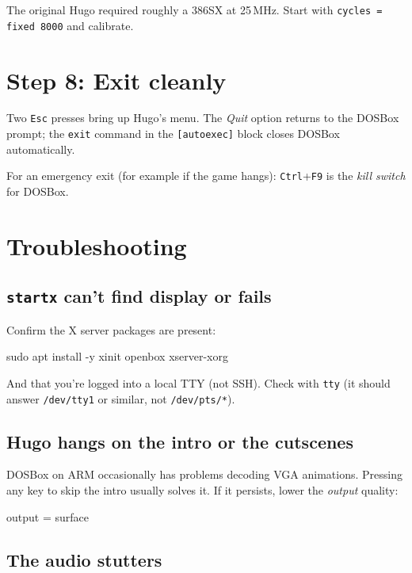 \begin{note}
The original Hugo required roughly a 386SX at 25\,MHz. Start with \texttt{cycles = fixed 8000} and calibrate.

\section{Step 8: Exit cleanly}

Two \texttt{Esc} presses bring up Hugo's menu. The \emph{Quit} option returns to the DOSBox prompt; the \texttt{exit} command in the \texttt{[autoexec]} block closes DOSBox automatically.

For an emergency exit (for example if the game hangs): \texttt{Ctrl}+\texttt{F9} is the \emph{kill switch} for DOSBox.

\section{Troubleshooting}

\subsection{\texttt{startx} can't find display or fails}

Confirm the X server packages are present:

\begin{shellcode}
sudo apt install -y xinit openbox xserver-xorg
\end{shellcode}

And that you're logged into a local TTY (not SSH). Check with \texttt{tty} (it should answer \texttt{/dev/tty1} or similar, not \texttt{/dev/pts/*}).

\subsection{Hugo hangs on the intro or the cutscenes}

DOSBox on ARM occasionally has problems decoding VGA animations. Pressing any key to skip the intro usually solves it. If it persists, lower the \emph{output} quality:

\begin{tomlcode}
[sdl]
output = surface
\end{tomlcode}

\subsection{The audio stutters}


\end{note}
